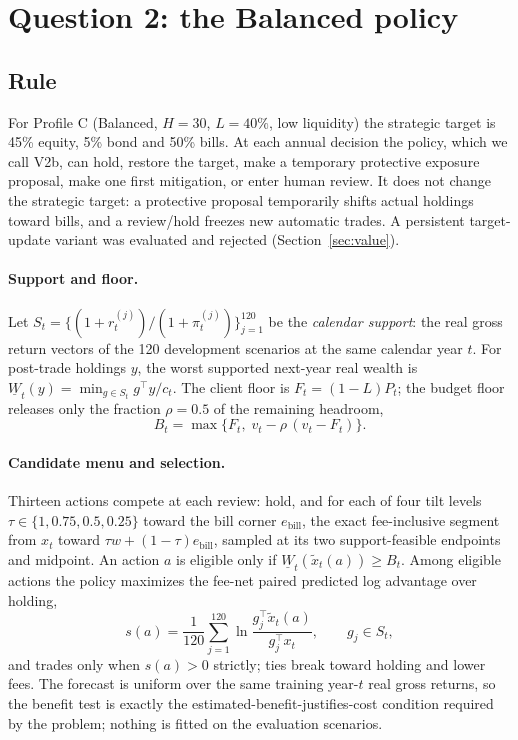 \documentclass[11pt,a4paper]{article}
\begin{document}
\section{Question 2: the Balanced policy}
\label{sec:q2}

\subsection{Rule}
\label{sec:rule}
For Profile C (Balanced, $H=30$, $L=40\%$, low liquidity) the strategic target is
45\% equity, 5\% bond and 50\% bills. At each annual decision the policy, which
we call V2b, can hold, restore the target, make a temporary protective exposure
proposal, make one first mitigation, or enter human review. It does not change
the strategic target: a protective proposal temporarily shifts actual holdings
toward bills, and a review/hold freezes new automatic trades. A persistent
target-update variant was evaluated and rejected
(Section~\ref{sec:value}).

\paragraph{Support and floor.}
Let $S_t=\bigl\{(1+r^{(j)}_t)/(1+\pi^{(j)}_t)\bigr\}_{j=1}^{120}$ be the
\emph{calendar support}: the real gross return vectors of the 120 development
scenarios at the same calendar year $t$. For post-trade holdings $y$, the worst
supported next-year real wealth is $\underline W_t(y)=\min_{g\in S_t} g^{\top}
y/c_t$. The client floor is $F_t=(1-L)P_t$; the budget floor releases only the
fraction $\rho=0.5$ of the remaining headroom,
\begin{equation}
B_t=\max\bigl\{F_t,\;v_t-\rho\,(v_t-F_t)\bigr\}.
\label{eq:floor}
\end{equation}

\paragraph{Candidate menu and selection.}
Thirteen actions compete at each review: hold, and for each of four tilt levels
$\tau\in\{1,0.75,0.5,0.25\}$ toward the bill corner $e_{\text{bill}}$, the exact
fee-inclusive segment from $x_t$ toward $\tau w+(1-\tau)e_{\text{bill}}$, sampled
at its two support-feasible endpoints and midpoint. An action $a$ is eligible
only if $\underline W_t(\tilde x_t(a))\ge B_t$. Among eligible actions the policy
maximizes the fee-net paired predicted log advantage over holding,
\begin{equation}
s(a)=\frac{1}{120}\sum_{j=1}^{120}\ln\frac{g_j^{\top}\tilde x_t(a)}{g_j^{\top}x_t},
\qquad g_j\in S_t,
\label{eq:score}
\end{equation}
and trades only when $s(a)>0$ strictly; ties break toward holding and lower fees.
The forecast is uniform over the same training year-$t$ real gross returns, so
the benefit test is exactly the estimated-benefit-justifies-cost condition
required by the problem; nothing is fitted on the evaluation scenarios.
\end{document}
